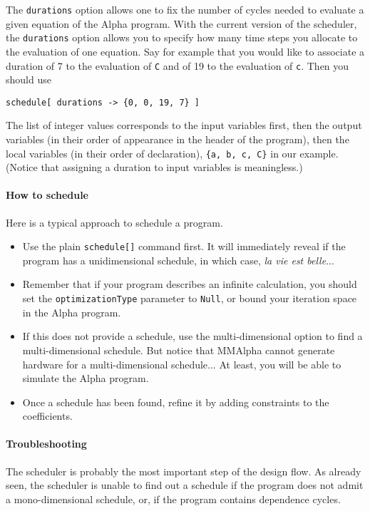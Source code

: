 \documentclass[12pt]{article}
\newcommand{\Alpha}{{\sc Alpha}}
\newcommand{\MMA}{{\sc MMAlpha}}
\newcommand{\alfa}{\Alpha}
\newcommand{\mmalpha}{\MMA}
\begin{document}
The \texttt{durations} option allows one to fix the number
of cycles needed to evaluate a given equation of the 
\alfa{} program. With the current version of the scheduler, 
the \texttt{durations} option allows you to specify how
many time steps you allocate to the evaluation of one 
equation. Say for example that you would like to associate 
a duration of 7 to the evaluation of \texttt{C} and of
19 to the evaluation of \texttt{c}. Then you should
use
\begin{verbatim}
schedule[ durations -> {0, 0, 19, 7} ]
\end{verbatim}
The list of integer values corresponds to the input variables
first, then the output variables (in their order of appearance
in the header of the program), then the local variables (in their
order of declaration), \texttt{\{a, b, c, C\}} in 
our example. (Notice that assigning a duration to input variables
is meaningless.)

\paragraph*{How to schedule}
Here is a typical approach to schedule a program. 
\begin{itemize}
\item Use the plain \texttt{schedule[]} command first.
It will immediately reveal if the program has a unidimensional 
schedule, in which case, {\em la vie est belle}...
\item Remember that if your program describes an infinite
calculation, you should set the \texttt{optimizationType}
parameter to \texttt{Null}, or bound your iteration space
in the \alfa{} program.
\item If this does not provide a schedule, use the multi-dimensional
option to find a multi-dimensional schedule. But notice that 
\mmalpha{} cannot generate hardware for a multi-dimensional 
schedule... At least, you will be able to simulate the
\alfa{} program.
\item Once a schedule has been found, refine
it by adding constraints to the coefficients. 
\end{itemize}

\paragraph*{Troubleshooting}
The scheduler is probably the most important step of 
the design flow. As already seen, the scheduler is unable
to find out a schedule if the program does not admit a mono-dimensional 
schedule, or, if the program contains dependence cycles.
\end{document}
